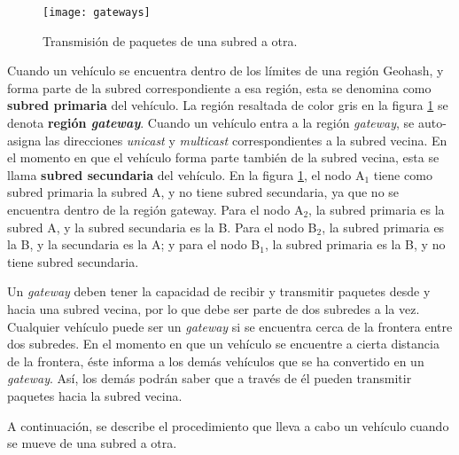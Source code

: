 \begin{figure}[th]
\centering
\texttt{[image: gateways]}
\decoRule
\caption[Transmisión de paquetes de una subred a otra]{Transmisión de paquetes
de una subred a otra.}
\label{fig:gateways}
\end{figure}

Cuando un vehículo se encuentra dentro de los límites de una región Geohash, y
forma parte de la subred correspondiente a esa región, esta se denomina como
\textbf{subred primaria} del vehículo. La región resaltada de color gris en la
figura \ref{fig:gateways} se denota \textbf{región \textit{gateway}}.
Cuando un vehículo entra a la región \textit{gateway}, se auto-asigna las
direcciones \textit{unicast} y \textit{multicast} correspondientes a la subred
vecina. En el momento en que el vehículo forma parte también de la subred
vecina, esta se llama \textbf{subred secundaria} del vehículo. En la figura
\ref{fig:gateways}, el nodo A$_1$ tiene como subred primaria la subred A, y
no tiene subred secundaria, ya que no se encuentra dentro de la región gateway.
Para el nodo A$_2$, la subred primaria es la subred A, y la subred secundaria es
la B. Para el nodo B$_2$, la subred primaria es la B, y la secundaria es la A; y
para el nodo B$_1$, la subred primaria es la B, y no tiene subred secundaria.

Un \textit{gateway} deben tener la capacidad de recibir y transmitir paquetes
desde y hacia una subred vecina, por lo que debe ser parte de dos subredes a la
vez. Cualquier vehículo puede ser un \textit{gateway} si se encuentra cerca de
la frontera entre dos subredes. En el momento en que un vehículo se encuentre a
cierta distancia de la frontera, éste informa a los demás vehículos que se ha
convertido en un \textit{gateway}. Así, los demás podrán saber que a través de
él pueden transmitir paquetes hacia la subred vecina.

A continuación, se describe el procedimiento que lleva a cabo un vehículo cuando
se mueve de una subred a otra.

